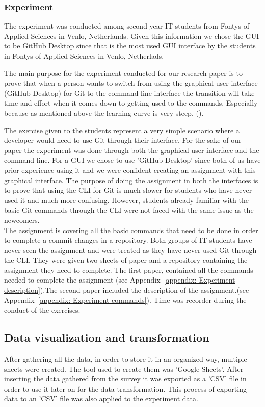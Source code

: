 \documentclass[]{report}
\begin{document}
	\subsubsection{Experiment}
	
	The experiment was conducted among second year IT students from Fontys of Applied Sciences in Venlo, Netherlands. Given this information we chose the GUI to be GitHub Desktop since that is the most used GUI interface by the students in Fontys of Applied Sciences in Venlo, Netherlads.
	
	
	The main purpose for the experiment conducted for our research paper is to prove that when a person wants to switch from using the graphical user interface (GitHub Desktop) for Git to the command line interface the transition will take time and effort when it comes down to getting used to the commands. Especially because as mentioned above the learning curve is very steep. (\cite{justin_c_bagley_reasons_nodate}).

	The exercise given to the students represent a very simple scenario where a developer would need to use Git through their interface. For the sake of our paper the experiment was done through both the graphical user interface and the command line. For a GUI we chose to use 'GitHub Desktop' since both of us have prior experience using it and we were confident creating an assignment with this graphical interface. The purpose of doing the assignment in both the interfaces is to prove that using the CLI for Git is much slower for students who have never used it and much more confusing. However, students already familiar with the basic Git commands through the CLI were not faced with the same issue as the newcomers.\\
	
	The assignment is covering all the basic commands that need to be done in order to complete a commit changes in a repository. Both groups of IT students have never seen the assignment and were treated as they have never used Git through the CLI. They were given two sheets of paper and a repository containing the assignment they need to complete. The first paper, contained all the commands needed to complete the assignment (see Appendix\ \ref{appendix: Experiment description}).The second paper included the description of the assignment.(see Appendix\ \ref{appendix: Experiment commands}). Time was recorder during the conduct of the exercises.
	
	
	\subsection{Data visualization and transformation}
	After gathering all the data, in order to store it in an organized way, multiple sheets were created. The tool used to create them was 'Google Sheets'. After inserting the data gathered from the survey it was exported as a 'CSV' file in order to use it later on for the data transformation. This process of exporting data to an 'CSV' file was also applied to the experiment data.\\
	
\end{document}
